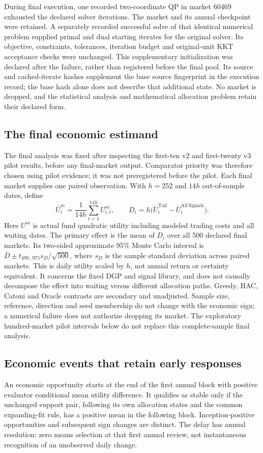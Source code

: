 During final execution, one recorded two-coordinate QP in market 60469
exhausted the declared solver iterations. The market and its annual checkpoint
were retained. A separately recorded successful solve of that identical
numerical problem supplied primal and dual starting iterates for the original
solver. Its objective, constraints, tolerances, iteration budget and
original-unit KKT acceptance checks were unchanged. This supplementary
initialization was declared after the failure, rather than registered before
the final pool. Its source and cached-iterate hashes supplement the base
source fingerprint in the execution record; the base hash alone does not
describe that additional state. No market is dropped, and the statistical
analysis and mathematical allocation problem retain their declared form.

\subsection{The final economic estimand}
The final analysis was fixed after inspecting the first-ten v2 and
first-twenty v3 pilot results, before any final-market output. Comparator
priority was therefore chosen using pilot evidence; it was not preregistered
before the pilot. Each final market supplies one paired observation. With
$h=252$ and $14h$ out-of-sample dates, define
\[
 \bar U_i^m=\frac1{14h}\sum_{t=1}^{14h}U_{i,t}^m,
 \qquad D_i=h\bigl(\bar U_i^{\mathrm{Tail}}
                         -\bar U_i^{\mathrm{All\ Signals}}\bigr).
\]
Here $U^m$ is actual fund quadratic utility including modeled trading costs
and all waiting dates. The primary effect is the mean of $D_i$ over all 500
declared final markets. Its two-sided approximate 95\% Monte Carlo interval
is $\bar D\pm t_{499,.975}s_D/\sqrt{500}$, where $s_D$ is the sample standard
deviation across paired markets. This is daily utility scaled by $h$, not
annual return or certainty equivalent. It concerns the fixed DGP and signal
library, and does not causally decompose the effect into waiting versus
different allocation paths. Greedy, HAC, Catoni and Oracle contrasts are
secondary and unadjusted. Sample size, reference, direction and seed membership
do not change with the economic sign; a numerical failure does not authorize
dropping its market. The exploratory hundred-market pilot intervals below do not replace
this complete-sample final analysis.

\subsection{Economic events that retain early responses}
An economic opportunity starts at the end of the first annual block with
positive evaluator conditional mean utility difference. It qualifies as stable
only if the unchanged support pair, following its own allocation states and
the common expanding-fit rule, has a positive mean in the following block.
Inception-positive opportunities and subsequent sign changes are distinct.
The delay has annual resolution: zero means selection at that first annual
review, not instantaneous recognition of an unobserved daily change.

